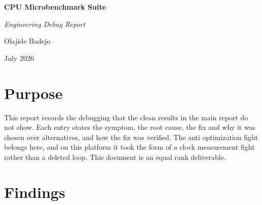 \documentclass[11pt,a4paper]{article}
\begin{document}
\begin{titlepage}
\centering
\vspace*{\fill}
{\Huge\bfseries CPU Microbenchmark Suite\par}
\vspace{0.8em}
{\Large\itshape Engineering Debug Report\par}
\vspace*{\fill}
{\large Olajide Badejo\par}
\vspace{0.5em}
{\large July 2026\par}
\vspace*{0.08\textheight}
\end{titlepage}

\clearpage
\begin{abstract}
This report records the debugging that the clean results do not show. On this
platform the anti optimization fight took the form of a clock measurement fight
rather than a deleted loop. Each finding states the symptom, the root cause, the
fix and why it was chosen, and how it was verified. It is an equal rank
deliverable.
\end{abstract}

\clearpage
\tableofcontents
\newpage

\section{Purpose}

This report records the debugging that the clean results in the main report do
not show. Each entry states the symptom, the root cause, the fix and why it was
chosen over alternatives, and how the fix was verified. The anti optimization
fight belongs here, and on this platform it took the form of a clock measurement
fight rather than a deleted loop. This document is an equal rank deliverable.

\section{Findings}
\end{document}
